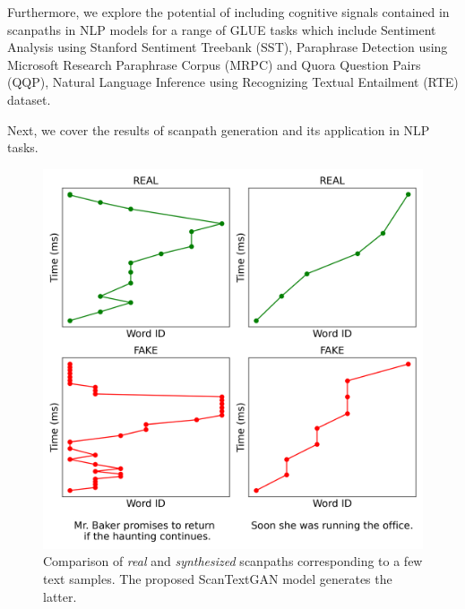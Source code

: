 Furthermore, we explore the potential of including cognitive signals contained in scanpaths in NLP models for a range of GLUE tasks which include Sentiment Analysis using Stanford Sentiment Treebank (SST), Paraphrase Detection using Microsoft Research Paraphrase Corpus (MRPC) and Quora Question Pairs (QQP), Natural Language Inference using Recognizing Textual Entailment (RTE) dataset.

Next, we cover the results of scanpath generation and its application in NLP tasks.



\begin{figure}[]
    \centering
    \includegraphics[width=0.7\columnwidth]{images/scanpath_plot_combined_sent_5.png}
    \caption{Comparison of \textit{real} and \textit{synthesized} scanpaths corresponding to a few text samples. The proposed ScanTextGAN model generates the latter.}
    \label{fig:scanpath_comparison}
\end{figure}


